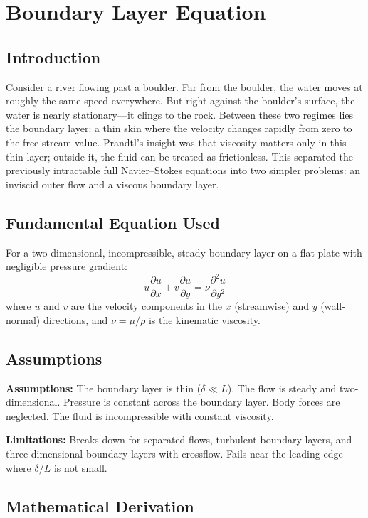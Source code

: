 \documentclass[11pt,openright]{book}
\begin{document}

\chapter{Boundary Layer Equation}

\section*{Introduction}

Consider a river flowing past a boulder. Far from the boulder, the water moves at roughly the same speed everywhere. But right against the boulder's surface, the water is nearly stationary---it clings to the rock. Between these two regimes lies the boundary layer: a thin skin where the velocity changes rapidly from zero to the free-stream value. Prandtl's insight was that viscosity matters only in this thin layer; outside it, the fluid can be treated as frictionless. This separated the previously intractable full Navier--Stokes equations into two simpler problems: an inviscid outer flow and a viscous boundary layer.
\section*{Fundamental Equation Used}

For a two-dimensional, incompressible, steady boundary layer on a flat plate with negligible pressure gradient:
\[
u\frac{\partial u}{\partial x} + v\frac{\partial u}{\partial y} = \nu \frac{\partial^2 u}{\partial y^2}
\]
where $u$ and $v$ are the velocity components in the $x$ (streamwise) and $y$ (wall-normal) directions, and $\nu = \mu/\rho$ is the kinematic viscosity.
\section*{Assumptions}

\textbf{Assumptions:} The boundary layer is thin ($\delta \ll L$). The flow is steady and two-dimensional. Pressure is constant across the boundary layer. Body forces are neglected. The fluid is incompressible with constant viscosity.


\textbf{Limitations:} Breaks down for separated flows, turbulent boundary layers, and three-dimensional boundary layers with crossflow. Fails near the leading edge where $\delta/L$ is not small.


\section*{Mathematical Derivation}
\end{document}
